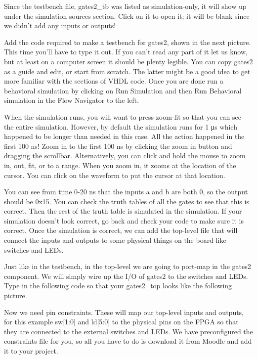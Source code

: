 
Since the testbench file, gates2\_tb was listed as simulation-only, it will show up under the
simulation sources section.
Click on it to open it; it will be blank since we didn't add any inputs or outputs!


Add the code required to make a testbench for gates2, shown in the next picture.
This time you'll have to type it out.
If you can't read any part of it let us know, but at least on a computer screen it should be
plenty legible.
You can copy gates2 as a guide and edit, or start from scratch.
The latter might be a good idea to get more familiar with the sections of VHDL code.
Once you are done run a behavioral simulation by clicking on Run Simulation and then Run
Behavioral simulation in the Flow Navigator to the left.


When the simulation runs, you will want to press zoom-fit so that you can see the entire
simulation.
However, by default the simulation runs for 1 μs which happened to be longer than needed in
this case.
All the action happened in the first 100 ns!
Zoom in to the first 100 ns by clicking the zoom in button and dragging the scrollbar.
Alternatively, you can click and hold the mouse to zoom in, out, fit, or to a range.
When you zoom in, it zooms at the location of the cursor.
You can click on the waveform to put the cursor at that location.


You can see from time 0-20 ns that the inputs a and b are both 0, so the output should be 0x15.
You can check the truth tables of all the gates to see that this is correct.
Then the rest of the truth table is simulated in the simulation.
If your simulation doesn't look correct, go back and check your code to make sure it is correct.
Once the simulation is correct, we can add the top-level file that will connect the inputs and
outputs to some physical things on the board like switches and LEDs.


Just like in the testbench, in the top-level we are going to port-map in the gates2 component.
We will simply wire up the I/O of gates2 to the switches and LEDs.
Type in the following code so that your gates2_top looks like the following picture.


Now we need pin constraints.
These will map our top-level inputs and outputs, for this example sw[1:0] and ld[5:0] to the
physical pins on the FPGA so that they are connected to the external switches and LEDs.
We have preconfigured the constraints file for you, so all you have to do is download it from
Moodle and add it to your project.

